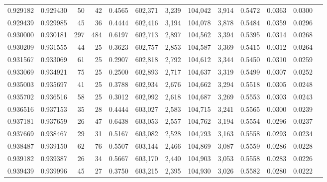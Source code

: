 \begin{tabular}{rrrrrrrrrrrrr}
0.929182 & 0.929430 &    50 &  42 &                                     0.4565 & 602,371 &   3,239 & 104,042 &   3,914 & 0.5472 & 0.0363 & 0.0300 \\
0.929439 & 0.929985 &    45 &  36 &                                     0.4444 & 602,416 &   3,194 & 104,078 &   3,878 & 0.5484 & 0.0359 & 0.0296 \\
0.930000 & 0.930181 &   297 & 484 &                                     0.6197 & 602,713 &   2,897 & 104,562 &   3,394 & 0.5395 & 0.0314 & 0.0268 \\
0.930209 & 0.931555 &    44 &  25 &                                     0.3623 & 602,757 &   2,853 & 104,587 &   3,369 & 0.5415 & 0.0312 & 0.0264 \\
0.931567 & 0.933069 &    61 &  25 &                                     0.2907 & 602,818 &   2,792 & 104,612 &   3,344 & 0.5450 & 0.0310 & 0.0259 \\
0.933069 & 0.934921 &    75 &  25 &                                     0.2500 & 602,893 &   2,717 & 104,637 &   3,319 & 0.5499 & 0.0307 & 0.0252 \\
0.935003 & 0.935697 &    41 &  25 &                                     0.3788 & 602,934 &   2,676 & 104,662 &   3,294 & 0.5518 & 0.0305 & 0.0248 \\
0.935702 & 0.936516 &    58 &  25 &                                     0.3012 & 602,992 &   2,618 & 104,687 &   3,269 & 0.5553 & 0.0303 & 0.0243 \\
0.936516 & 0.937153 &    35 &  28 &                                     0.4444 & 603,027 &   2,583 & 104,715 &   3,241 & 0.5565 & 0.0300 & 0.0239 \\
0.937181 & 0.937659 &    26 &  47 &                                     0.6438 & 603,053 &   2,557 & 104,762 &   3,194 & 0.5554 & 0.0296 & 0.0237 \\
0.937669 & 0.938467 &    29 &  31 &                                     0.5167 & 603,082 &   2,528 & 104,793 &   3,163 & 0.5558 & 0.0293 & 0.0234 \\
0.938487 & 0.939150 &    62 &  76 &                                     0.5507 & 603,144 &   2,466 & 104,869 &   3,087 & 0.5559 & 0.0286 & 0.0228 \\
0.939182 & 0.939387 &    26 &  34 &                                     0.5667 & 603,170 &   2,440 & 104,903 &   3,053 & 0.5558 & 0.0283 & 0.0226 \\
0.939439 & 0.939996 &    45 &  27 &                                     0.3750 & 603,215 &   2,395 & 104,930 &   3,026 & 0.5582 & 0.0280 & 0.0222 \\

\end{tabular}
